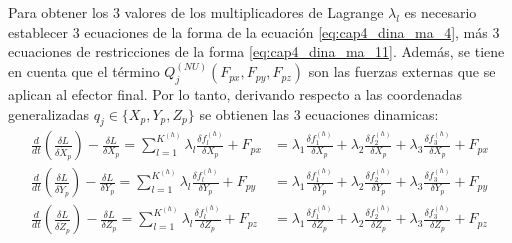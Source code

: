             Para obtener los 3 valores de los multiplicadores de Lagrange  \(  \lambda _{l} \)  es necesario establecer 3 ecuaciones de la forma de la ecuación \ref{eq:cap4_dina_ma_4}, más 3 ecuaciones de restricciones de la forma \ref{eq:cap4_dina_ma_11}. Además, se tiene en cuenta que el término  \( Q_{j}^{ \left( NU \right) } \left( F_{px},F_{py},F_{pz} \right)  \)  son las fuerzas externas que se aplican al efector final. Por lo tanto, derivando respecto a las coordenadas generalizadas  $q_{j} \in \{ X_{p},Y_{p},Z_{p} \}$  se obtienen las 3 ecuaciones dinamicas:
            \begin{align}
            \label{eq:multi_lamda_1}
             \frac{d}{dt} \left( \frac{ \delta L}{ \delta \dot{X}_{p}} \right) -\frac{ \delta L}{ \delta X_{p}}= \sum _{l=1}^{K^{ \left( h \right) }} \lambda _{l}\frac{ \delta f_{l}^{ \left( h \right) }}{ \delta X_{p}}+F_{px}&= \lambda _{1}\frac{ \delta f_{1}^{ \left( h \right) }}{ \delta X_{p}}+ \lambda _{2}\frac{ \delta f_{2}^{ \left( h \right) }}{ \delta X_{p}}+ \lambda _{3}\frac{ \delta f_{3}^{ \left( h \right) }}{ \delta X_{p}}+F_{px} \\
            \label{eq:multi_lamda_2}
             \frac{d}{dt} \left( \frac{ \delta L}{ \delta \dot{Y}_{p}} \right) -\frac{ \delta L}{ \delta Y_{p}}= \sum _{l=1}^{K^{ \left( h \right) }} \lambda _{l}\frac{ \delta f_{l}^{ \left( h \right) }}{ \delta Y_{p}}+F_{py}&= \lambda _{1}\frac{ \delta f_{1}^{ \left( h \right) }}{ \delta Y_{p}}+ \lambda _{2}\frac{ \delta f_{2}^{ \left( h \right) }}{ \delta Y_{p}}+ \lambda _{3}\frac{ \delta f_{3}^{ \left( h \right) }}{ \delta Y_{p}}+F_{py} \\ 
            \label{eq:multi_lamda_3}
             \frac{d}{dt} \left( \frac{ \delta L}{ \delta \dot{Z}_{p}} \right) -\frac{ \delta L}{ \delta Z_{p}}= \sum _{l=1}^{K^{ \left( h \right) }} \lambda _{l}\frac{ \delta f_{l}^{ \left( h \right) }}{ \delta Z_{p}}+F_{pz}&= \lambda _{1}\frac{ \delta f_{1}^{ \left( h \right) }}{ \delta Z_{p}}+ \lambda _{2}\frac{ \delta f_{2}^{ \left( h \right) }}{ \delta Z_{p}}+ \lambda _{3}\frac{ \delta f_{3}^{ \left( h \right) }}{ \delta Z_{p}}+F_{pz}
            \end{align}
            
